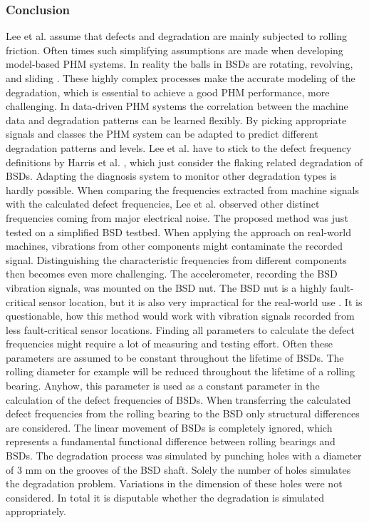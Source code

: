 \subsubsection{Conclusion}
Lee et al. \cite{Lee2015} assume that defects and degradation are mainly subjected to rolling friction. Often times such simplifying assumptions are made when developing model-based PHM systems. In reality the balls in BSDs are rotating, revolving, and sliding \cite{Lee2015}. These highly complex processes make the accurate modeling of the degradation, which is essential to achieve a good PHM performance, more challenging. In data-driven PHM systems the correlation between the machine data and degradation patterns can be learned flexibly. By picking appropriate signals and classes the PHM system can be adapted to predict different degradation patterns and levels. Lee et al. \cite{Lee2015} have to stick to the defect frequency definitions by Harris et al. \cite{Harris1996}, which just consider the flaking related degradation of BSDs. Adapting the diagnosis system to monitor other degradation types is hardly possible. When comparing the frequencies extracted from machine signals with the calculated defect frequencies, Lee et al. observed other distinct frequencies coming from major electrical noise. The proposed method was just tested on a simplified BSD testbed. When applying the approach on real-world machines, vibrations from other components might contaminate the recorded signal. Distinguishing the characteristic frequencies from different components then becomes even more challenging. The accelerometer, recording the BSD vibration signals, was mounted on the BSD nut. The BSD nut is a highly fault-critical sensor location, but it is also very impractical for the real-world use \cite{Pandhare2021}. It is questionable, how this method would work with vibration signals recorded from less fault-critical sensor locations. Finding all parameters to calculate the defect frequencies might require a lot of measuring and testing effort. Often these parameters are assumed to be constant throughout the lifetime of BSDs. The rolling diameter for example will be reduced throughout the lifetime of a rolling bearing. Anyhow, this parameter is used as a constant parameter in the calculation of the defect frequencies of BSDs. When transferring the calculated defect frequencies from the rolling bearing to the BSD only structural differences are considered. The linear movement of BSDs is completely ignored, which represents a fundamental functional difference between rolling bearings and BSDs. The degradation process was simulated by punching holes with a diameter of 3 mm on the grooves of the BSD shaft. Solely the number of holes simulates the degradation problem. Variations in the dimension of these holes were not considered. In total it is disputable whether the degradation is simulated appropriately.  

